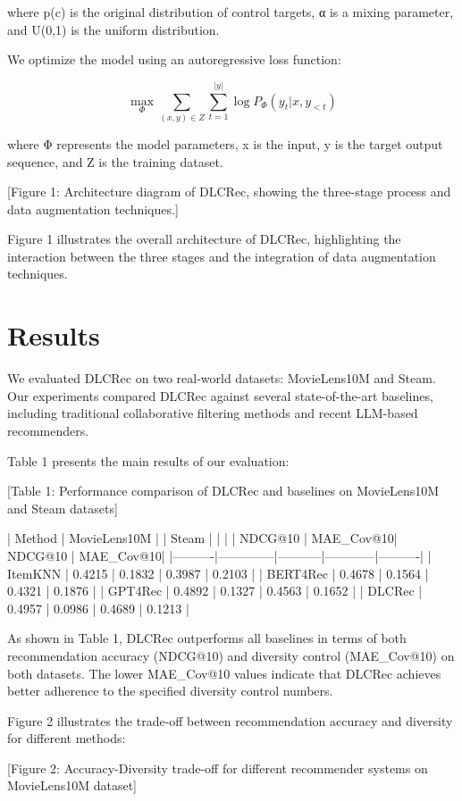 \documentclass[10pt,twocolumn,letterpaper]{article}
\begin{document}
where p(c) is the original distribution of control targets, α is a mixing parameter, and U(0,1) is the uniform distribution.

We optimize the model using an autoregressive loss function:

\[ \max_{\Phi} \sum_{(x,y)\in Z} \sum_{t=1}^{|y|} \log P_{\Phi}(y_t|x,y_{<t}) \]

where Φ represents the model parameters, x is the input, y is the target output sequence, and Z is the training dataset.

[Figure 1: Architecture diagram of DLCRec, showing the three-stage process and data augmentation techniques.]

Figure 1 illustrates the overall architecture of DLCRec, highlighting the interaction between the three stages and the integration of data augmentation techniques.

\section{Results}

We evaluated DLCRec on two real-world datasets: MovieLens10M and Steam. Our experiments compared DLCRec against several state-of-the-art baselines, including traditional collaborative filtering methods and recent LLM-based recommenders.

Table 1 presents the main results of our evaluation:

[Table 1: Performance comparison of DLCRec and baselines on MovieLens10M and Steam datasets]

| Method   | MovieLens10M |           | Steam      |           |
|          | NDCG@10      | MAE_Cov@10| NDCG@10    | MAE_Cov@10|
|----------|--------------|-----------|------------|----------|
| ItemKNN  | 0.4215       | 0.1832    | 0.3987     | 0.2103   |
| BERT4Rec | 0.4678       | 0.1564    | 0.4321     | 0.1876   |
| GPT4Rec  | 0.4892       | 0.1327    | 0.4563     | 0.1652   |
| DLCRec   | 0.4957       | 0.0986    | 0.4689     | 0.1213   |

As shown in Table 1, DLCRec outperforms all baselines in terms of both recommendation accuracy (NDCG@10) and diversity control (MAE_Cov@10) on both datasets. The lower MAE_Cov@10 values indicate that DLCRec achieves better adherence to the specified diversity control numbers.

Figure 2 illustrates the trade-off between recommendation accuracy and diversity for different methods:

[Figure 2: Accuracy-Diversity trade-off for different recommender systems on MovieLens10M dataset]
\end{document}
